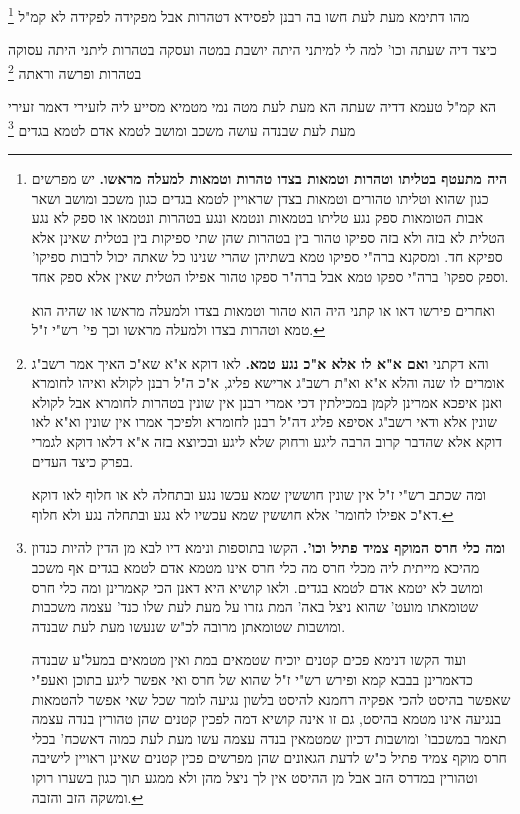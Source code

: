\documentclass[12pt, openany]{book}
\newcommand{\footnotecomment}[1]{\footnote{#1}}
\newcommand{\commenta}[1]{\footnotecomment{#1}}
\begin{document}
{מהו דתימא  מעת לעת חשו בה רבנן לפסידא דטהרות אבל מפקידה לפקידה לא קמ"ל
\commenta{\textbf{היה מתעטף בטליתו וטהרות וטמאות בצדו טהרות וטמאות למעלה מראשו.}  יש מפרשים כגון שהוא וטליתו טהורים וטמאות בצדן שראויין לטמא בגדים כגון משכב ומושב ושאר אבות הטומאות ספק נגע טליתו בטמאות ונטמא ונגע בטהרות ונטמאו או ספק לא נגע הטלית לא בזה ולא בזה ספיקו טהור בין בטהרות שהן שתי ספיקות בין בטלית שאינן אלא ספיקא חד. ומסקנא ברה"י ספיקו טמא בשתיהן שהרי שנינו כל שאתה יכול לרבות ספיקו' וספק ספקו' ברה"י ספקו טמא אבל ברה"ר ספקו טהור אפילו הטלית שאין אלא ספק אחד.\par  ואחרים פירשו דאו או קתני היה הוא טהור וטמאות בצדו ולמעלה מראשו או שהיה הוא טמא וטהרות בצדו ולמעלה מראשו וכך פי' רש"י ז"ל. }

כיצד דיה שעתה וכו' למה לי למיתני היתה יושבת במטה ועסקה בטהרות  ליתני היתה עסוקה בטהרות ופרשה וראתה 
\commenta{והא דקתני \textbf{ואם א"א לו אלא א"כ נגע טמא.}  לאו דוקא א"א שא"כ האיך אמר רשב"ג אומרים לו שנה והלא א"א וא"ת רשב"ג ארישא פליג, א"כ ה"ל רבנן לקולא ואיהו לחומרא ואנן איפכא אמרינן לקמן במכילתין דכי אמרי רבנן אין שונין בטהרות לחומרא אבל לקולא שונין אלא ודאי רשב"ג אסיפא פליג דה"ל רבנן לחומרא ולפיכך אמרו אין שונין וא"א לאו דוקא אלא שהדבר קרוב הרבה ליגע ורחוק שלא ליגע ובכיוצא בזה א"א דלאו דוקא לגמרי בפרק כיצד העדים.\par  ומה שכתב רש"י ז"ל אין שונין חוששין שמא עכשו נגע ובתחלה לא או חלוף לאו דוקא דא"כ אפילו לחומר' אלא חוששין שמא עכשיו לא נגע ובתחלה נגע ולא חלוף. }

הא קמ"ל  טעמא דדיה שעתה הא מעת לעת מטה נמי מטמיא  מסייע ליה לזעירי דאמר זעירי  מעת לעת שבנדה עושה משכב ומושב לטמא אדם לטמא בגדים 
\commenta{\textbf{ומה כלי חרס המוקף צמיד פתיל וכו'.}  הקשו בתוספות ונימא דיו לבא מן הדין להיות כנדון מהיכא מייתית ליה מכלי חרס מה כלי חרס אינו מטמא אדם לטמא בגדים אף משכב ומושב לא יטמא אדם לטמא בגדים. ולאו קושיא היא דאנן הכי קאמרינן ומה כלי חרס שטומאתו מועט' שהוא ניצל באה' המת גזרו על מעת לעת שלו כנד' עצמה משכבות ומושבות שטומאתן מרובה לכ"ש שנעשו מעת לעת שבנדה.\par  ועוד הקשו דנימא פכים קטנים יוכיח שטמאים במת ואין מטמאים במעל"ע שבנדה כדאמרינן בבבא קמא ופירש רש"י ז"ל שהוא של חרס ואי אפשר ליגע בתוכן ואעפ"י שאפשר בהיסט להכי אפקיה רחמנא להיסט בלשון נגיעה לומר שכל שאי אפשר להטמאות בנגיעה אינו מטמא בהיסט, גם זו אינה קושיא דמה לפכין קטנים שהן טהורין בנדה עצמה תאמר במשכבו' ומושבות דכיון שמטמאין בנדה עצמה עשו מעת לעת כמוה דאשכח' בכלי חרס מוקף צמיד פתיל כ"ש לדעת הגאונים שהן מפרשים פכין קטנים שאינן ראויין לישיבה וטהורין במדרס הזב אבל מן ההיסט אין לך ניצל מהן ולא ממגע תוך כגון בשערו רוקו ומשקה הזב והזבה. }

}
\end{document}
